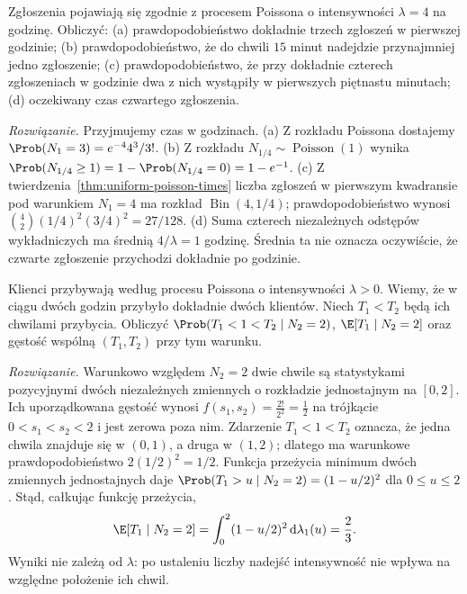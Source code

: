 \begin{zadanie}
Zgłoszenia pojawiają się zgodnie z procesem Poissona o
intensywności $\lambda=4$ na godzinę. Obliczyć: (a)
prawdopodobieństwo dokładnie trzech zgłoszeń w pierwszej godzinie;
(b) prawdopodobieństwo, że do chwili $15$ minut nadejdzie
przynajmniej jedno zgłoszenie; (c) prawdopodobieństwo,
że przy dokładnie czterech zgłoszeniach w godzinie dwa z nich
wystąpiły w pierwszych piętnastu minutach;
(d) oczekiwany czas czwartego zgłoszenia.

\emph{Rozwiązanie.} Przyjmujemy czas w godzinach.
(a) Z rozkładu Poissona dostajemy
$\Prob(N_1=3)=e^{-4}4^3/3!$.
(b) Z rozkładu $N_{1/4}\sim\operatorname{Poisson}(1)$
wynika $\Prob(N_{1/4}\ge1)=1-\Prob(N_{1/4}=0)=1-e^{-1}$.
(c) Z twierdzenia~\ref{thm:uniform-poisson-times} liczba
zgłoszeń w pierwszym kwadransie pod warunkiem $N_1=4$
ma rozkład $\operatorname{Bin}(4,1/4)$; prawdopodobieństwo
wynosi $\binom42(1/4)^2(3/4)^2=27/128$.
(d) Suma czterech niezależnych odstępów wykładniczych ma średnią
$4/\lambda=1$ godzinę. Średnia ta nie oznacza oczywiście, że
czwarte zgłoszenie przychodzi dokładnie po godzinie.
\end{zadanie}


\begin{zadanie}
Klienci przybywają według procesu Poissona o intensywności
$\lambda>0$. Wiemy, że w ciągu dwóch godzin przybyło dokładnie
dwóch klientów. Niech $T_1<T_2$ będą ich chwilami przybycia.
Obliczyć $\Prob(T_1<1<T_2\mid N_2=2)$,
$\E[T_1\mid N_2=2]$ oraz gęstość wspólną $(T_1,T_2)$
przy tym warunku.

\emph{Rozwiązanie.} Warunkowo względem $N_2=2$
dwie chwile są statystykami pozycyjnymi dwóch niezależnych
zmiennych o rozkładzie jednostajnym na $[0,2]$.
Ich uporządkowana gęstość wynosi
$f(s_1,s_2)=\frac{2!}{2^2}=\frac12$ na trójkącie
$0<s_1<s_2<2$ i jest zerowa poza nim. Zdarzenie
$T_1<1<T_2$ oznacza, że jedna chwila znajduje się
w $(0,1)$, a druga w $(1,2)$; dlatego ma warunkowe
prawdopodobieństwo $2(1/2)^2=1/2$.
Funkcja przeżycia minimum dwóch zmiennych jednostajnych daje
$\Prob(T_1>u\mid N_2=2)=(1-u/2)^2$ dla $0\le u\le2$.
Stąd, całkując funkcję przeżycia,
\[
\E[T_1\mid N_2=2]
=\int_0^2(1-u/2)^2\,\mathrm d\lambda_1(u)=\frac23.
\]
Wyniki nie zależą od $\lambda$: po ustaleniu liczby nadejść
intensywność nie wpływa na względne położenie ich chwil.
\end{zadanie}

